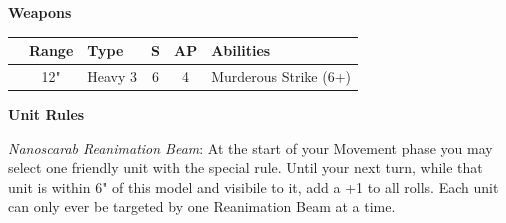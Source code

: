 \begin{minipage}[t]{0.72\textwidth}
	
	\vspace*{2em}
	\textbf{Weapons}
	
	\begin{tabular}{L{90 pt} c C{40pt} *{2}{c} >{\raggedright\arraybackslash}p{130pt}}
		& Range & Type & S & AP & Abilities \\
		\hline
		 & 12" & Heavy 3 & 6 & 4 & Murderous Strike (6+) \\
	\end{tabular}

	\vspace*{2em}
	\textbf{Unit Rules}
	
	\textit{Nanoscarab Reanimation Beam}: At the start of your Movement phase you may select one friendly unit with the  special rule. Until your next turn, while that unit is within 6" of this model and visibile to it, add a +1 to all  rolls. Each unit can only ever be targeted by one Reanimation Beam at a time.
\end{minipage}


\newpage
